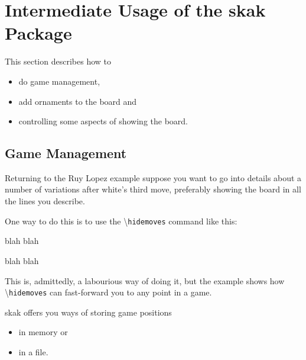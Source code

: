 \documentclass[10pt]{article}
\makeatletter
\renewcommand\showboard{\print@board}
\let\ORIshowboard\showboard
\renewcommand\showboard{%
    \makebox[8\squarelength]{%
    \rule{0pt}{9\squarelength}%
    \begin{postscript}%
    [trim = \squarelength{} 0pt \squarelength{} 0pt]
    \ORIshowboard
    \end{postscript}}}
\newcommand{\package}[1]{\textsf{#1}}
\newcommand{\command}[1]{\textbackslash\texttt{#1}}
\makeatother
\begin{document}
\section{Intermediate Usage of the \package{skak} Package}
\label{sec:intermediate}

This section describes how to
\begin{itemize}
\item do game management,
\item add ornaments to the board and
\item controlling some aspects of showing the board.
\end{itemize}


\subsection{Game Management}
\label{sec:game-management}

Returning to the Ruy Lopez example suppose you want to go into details
about a number of variations after white's third move, preferably
showing the board in all the lines you describe.

One way to do this is to use the \command{hidemoves} command like
this:

\begin{LTXexample}
\newgame
{}

\showboard
\end{LTXexample}

\begin{LTXexample}
 blah blah

\showboard

\end{LTXexample}

\begin{LTXexample}
\newgame
{}
 blah blah

\showboard
\end{LTXexample}

This is, admittedly, a labourious way of doing it, but the example
shows how \command{hidemoves} can fast-forward you to any point in a game.


\package{skak} offers you ways of storing game positions
\begin{itemize}
\item in memory or
\item in a file.
\end{itemize}
\end{document}
